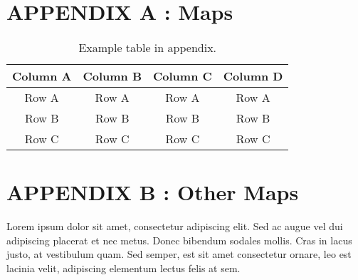 \chapter{{APPENDIX A : }{\normalfont Maps}}

\begin{table*}[!ht]
{\setlength{\tabcolsep}{14pt}
\caption{Example table in appendix.}
\begin{center}
\vspace{-6mm}
\begin{tabular}{cccc}
\hline\hline
Column A & Column B & Column C & Column D \\
\hline
Row A & Row A & Row A & Row A \\
Row B & Row B & Row B & Row B \\
Row C & Row C & Row C & Row C \\
\hline
\end{tabular}
\vspace{-6mm}
\end{center}
\label{tableappendix}}
\end{table*}

\newpage

\chapter{{APPENDIX B : }{\normalfont Other Maps}}

Lorem ipsum dolor sit amet, consectetur adipiscing elit. Sed ac augue vel dui 
adipiscing placerat et nec metus. Donec bibendum sodales mollis. Cras in lacus 
justo, at vestibulum quam. Sed semper, est sit amet consectetur ornare, leo est 
lacinia velit, adipiscing elementum lectus felis at sem.

\newpage







